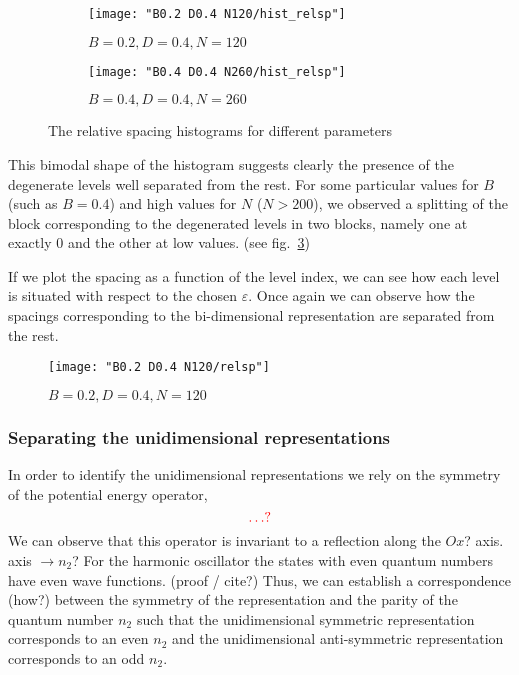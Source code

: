 \documentclass[../thesis.tex]{subfiles}
\begin{document}
\begin{figure}[h!]
  \centering
  \begin{subfigure}[b]{0.49\textwidth}
    \centering
    \texttt{[image: "B0.2 D0.4 N120/hist\_relsp"]}
    \caption{\(B=0.2, D=0.4, N=120\)}%
    \label{fig:relsp-b0.2n120}  %
  \end{subfigure}
  \begin{subfigure}[b]{0.49\textwidth}
    \centering
    \texttt{[image: "B0.4 D0.4 N260/hist\_relsp"]} %
    \caption{\(B=0.4, D=0.4, N=260\)}%
    \label{fig:relsp-b0.4n260}  %
  \end{subfigure}
  \caption{The relative spacing histograms for different parameters}
\end{figure}

This bimodal shape of the histogram suggests clearly the presence of the degenerate
levels well separated from the rest.
For some particular values for $B$ (such as \(B = 0.4\)) and high values for
$N$ (\( N > 200 \)), we observed a splitting of the block corresponding to
the degenerated levels in two blocks, namely one at exactly 0 and the other at low values.
(see fig.~\ref{fig:relsp-b0.4n260})

If we plot the spacing as a function of the level index, we can see how
each level is situated with respect to the chosen \( \varepsilon \).
Once again we can observe how the spacings corresponding to the bi-dimensional
representation are separated from the rest.

\begin{figure}[H]
  \centering
  \texttt{[image: "B0.2 D0.4 N120/relsp"]}
  \caption{\(B=0.2, D=0.4, N=120\)}
\end{figure}

\subsubsection{Separating the unidimensional representations}

In order to identify the unidimensional representations we rely on the symmetry
of the potential energy operator,
\[
  \color{red}\dots ?
\]
We can observe that this operator is invariant to a reflection along the
{\color{red}\(Ox\)?} axis.
{\color{red} axis \(\rightarrow n_2\)?}
For the harmonic oscillator the states with even quantum numbers have even wave functions.
{\color{red} (proof / cite?)}
Thus, we can establish a correspondence {\color{red} (how?)} between the symmetry of the
representation and the parity of the quantum number \(n_2\) such that the
unidimensional symmetric representation corresponds to an even \(n_2\) and the
unidimensional anti-symmetric representation corresponds to an odd \(n_2\).
\end{document}
